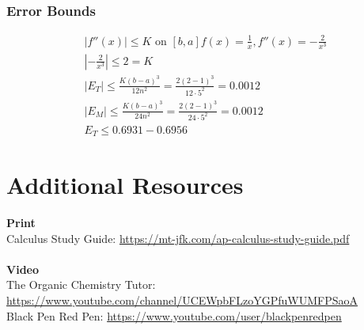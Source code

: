 \documentclass[12pt, letterpaper]{article}
\begin{document}
\subsubsection{Error Bounds}
\begin{gather*}
  |f''(x)| \leq K \text{ on } [b,a] f(x) = \frac{1}{x}, f''(x)=-\frac{2}{x^3}\\
  \left |-\frac{2}{x^3} \right | \leq 2 = K\\
  |E_T| \leq \frac{K(b-a)^3}{12n^2} = \frac{2(2-1)^3}{12 \cdot 5^2} = 0.0012\\
  |E_M| \leq \frac{K(b-a)^3}{24n^2} = \frac{2(2-1)^3}{24 \cdot 5^2} = 0.0012\\
  E_T \leq 0.6931-0.6956
\end{gather*}

\pagebreak

\section{Additional Resources}
\textbf{Print}\\
Calculus Study Guide: \url{https://mt-jfk.com/ap-calculus-study-guide.pdf}\\
\\
\textbf{Video}\\
The Organic Chemistry Tutor: \url{https://www.youtube.com/channel/UCEWpbFLzoYGPfuWUMFPSaoA}\\
Black Pen Red Pen: \url{https://www.youtube.com/user/blackpenredpen}
\end{document}
